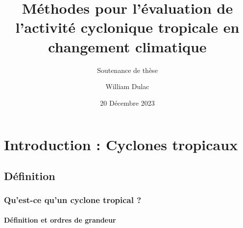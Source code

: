 \documentclass[aspectratio=169, usepdftitle=false, xcolor={dvipsnames}, 9pt]{beamer}
\title{Méthodes pour l'évaluation de l'activité cyclonique tropicale en changement climatique}
\author[William]{William Dulac}
\subtitle{Soutenance de thèse}
\institute{Centre National de Recherches Météorologiques}
\date{20 Décembre 2023}
\begin{document}
\maketitle

\section[Introduction]{Introduction : Cyclones tropicaux}

\makesecslide

\subsection{Définition}

\begin{frame}[c]
    \frametitle{Qu'est-ce qu'un cyclone tropical ?}
    \framesubtitle{Définition et ordres de grandeur}
    \begin{columns}
        \begin{column}{0.5\textwidth}
            
        \end{column}
        \begin{column}{0.5\textwidth}
            
        \end{column}
    \end{columns}
\end{frame}
\end{document}
